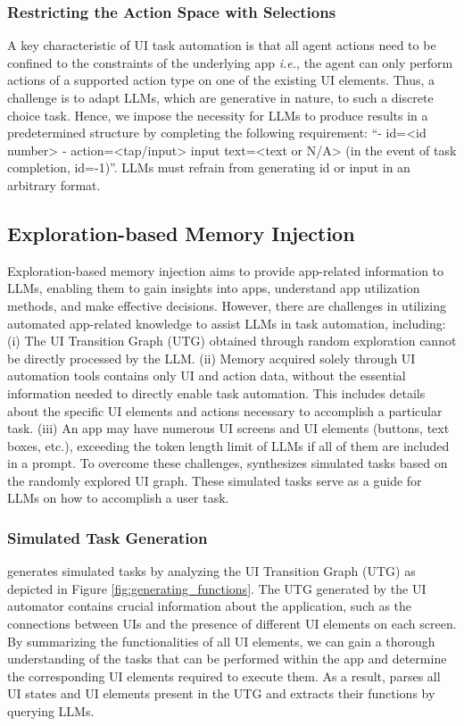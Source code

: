 \subsubsection{Restricting the Action Space with Selections}
A key characteristic of UI task automation is that all agent actions need to be confined to the constraints of the underlying app \textit{i.e.}, the agent can only perform actions of a supported action type on one of the existing UI elements. Thus, a challenge is to adapt LLMs, which are generative in nature, to such a discrete choice task. 
Hence, we impose the necessity for LLMs to produce results in a predetermined structure by completing the following requirement: ``- id=<id number> - action=<tap/input> input text=<text or N/A> (in the event of task completion, id=-1)''. LLMs must refrain from generating id or input in an arbitrary format.

\subsection{Exploration-based Memory Injection}

Exploration-based memory injection aims to provide app-related information to LLMs, enabling them to gain insights into apps, understand app utilization methods, and make effective decisions. However, there are challenges in utilizing automated app-related knowledge to assist LLMs in task automation, including: (i) The UI Transition Graph (UTG) obtained through random exploration cannot be directly processed by the LLM. (ii) Memory acquired solely through UI automation tools contains only UI and action data, without the essential information needed to directly enable task automation. This includes details about the specific UI elements and actions necessary to accomplish a particular task. 
(iii) An app may have numerous UI screens and UI elements (buttons, text boxes, etc.), exceeding the token length limit of LLMs if all of them are included in a prompt.
To overcome these challenges, \name synthesizes simulated tasks based on the randomly explored UI graph. %
These simulated tasks serve as a guide for LLMs on how to accomplish a user task.

\subsubsection{Simulated Task Generation}

\name generates simulated tasks by analyzing the UI Transition Graph (UTG) as depicted in Figure \ref{fig:generating_functions}. 
The UTG generated by the UI automator contains crucial information about the application, such as the connections between UIs and the presence of different UI elements on each screen. By summarizing the functionalities of all UI elements, we can gain a thorough understanding of the tasks that can be performed within the app and determine the corresponding UI elements required to execute them. As a result, \name parses all UI states and UI elements present in the UTG and extracts their functions by querying LLMs.

